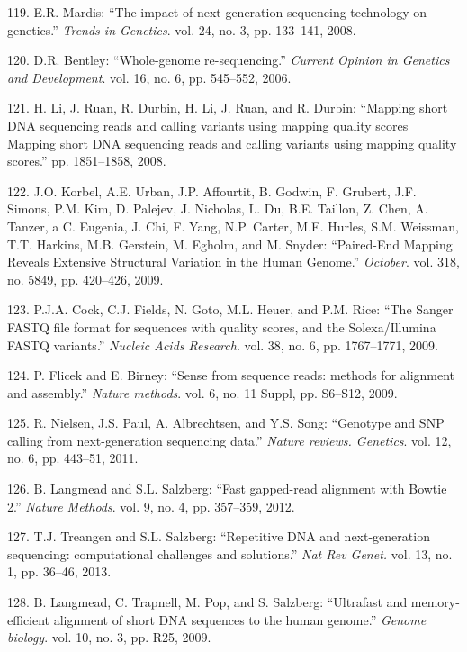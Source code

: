 \documentclass[12pt,twoside]{ugathesis}
\theoremstyle{definition}
\theoremstyle{definition}
\theoremstyle{remark}
\begin{document}
\hypertarget{ref-Mardis2008}{}
119. E.R. Mardis: ``The impact of next-generation sequencing technology
on genetics.'' \emph{Trends in Genetics}. vol. 24, no. 3, pp. 133--141,
2008.

\hypertarget{ref-Bentley2006}{}
120. D.R. Bentley: ``Whole-genome re-sequencing.'' \emph{Current Opinion
in Genetics and Development}. vol. 16, no. 6, pp. 545--552, 2006.

\hypertarget{ref-Li2008}{}
121. H. Li, J. Ruan, R. Durbin, H. Li, J. Ruan, and R. Durbin: ``Mapping
short DNA sequencing reads and calling variants using mapping quality
scores Mapping short DNA sequencing reads and calling variants using
mapping quality scores.'' pp. 1851--1858, 2008.

\hypertarget{ref-Korbel2009}{}
122. J.O. Korbel, A.E. Urban, J.P. Affourtit, B. Godwin, F. Grubert,
J.F. Simons, P.M. Kim, D. Palejev, J. Nicholas, L. Du, B.E. Taillon, Z.
Chen, A. Tanzer, a C. Eugenia, J. Chi, F. Yang, N.P. Carter, M.E.
Hurles, S.M. Weissman, T.T. Harkins, M.B. Gerstein, M. Egholm, and M.
Snyder: ``Paired-End Mapping Reveals Extensive Structural Variation in
the Human Genome.'' \emph{October}. vol. 318, no. 5849, pp. 420--426,
2009.

\hypertarget{ref-Cock2009}{}
123. P.J.A. Cock, C.J. Fields, N. Goto, M.L. Heuer, and P.M. Rice: ``The
Sanger FASTQ file format for sequences with quality scores, and the
Solexa/Illumina FASTQ variants.'' \emph{Nucleic Acids Research}. vol.
38, no. 6, pp. 1767--1771, 2009.

\hypertarget{ref-Flicek2009}{}
124. P. Flicek and E. Birney: ``Sense from sequence reads: methods for
alignment and assembly.'' \emph{Nature methods}. vol. 6, no. 11 Suppl,
pp. S6--S12, 2009.

\hypertarget{ref-Nielsen2011}{}
125. R. Nielsen, J.S. Paul, A. Albrechtsen, and Y.S. Song: ``Genotype
and SNP calling from next-generation sequencing data.'' \emph{Nature
reviews. Genetics}. vol. 12, no. 6, pp. 443--51, 2011.

\hypertarget{ref-Langmead2012}{}
126. B. Langmead and S.L. Salzberg: ``Fast gapped-read alignment with
Bowtie 2.'' \emph{Nature Methods}. vol. 9, no. 4, pp. 357--359, 2012.

\hypertarget{ref-Treangen2013}{}
127. T.J. Treangen and S.L. Salzberg: ``Repetitive DNA and
next-generation sequencing: computational challenges and solutions.''
\emph{Nat Rev Genet.} vol. 13, no. 1, pp. 36--46, 2013.

\hypertarget{ref-Langmead2009}{}
128. B. Langmead, C. Trapnell, M. Pop, and S. Salzberg: ``Ultrafast and
memory-efficient alignment of short DNA sequences to the human genome.''
\emph{Genome biology}. vol. 10, no. 3, pp. R25, 2009.
\end{document}
